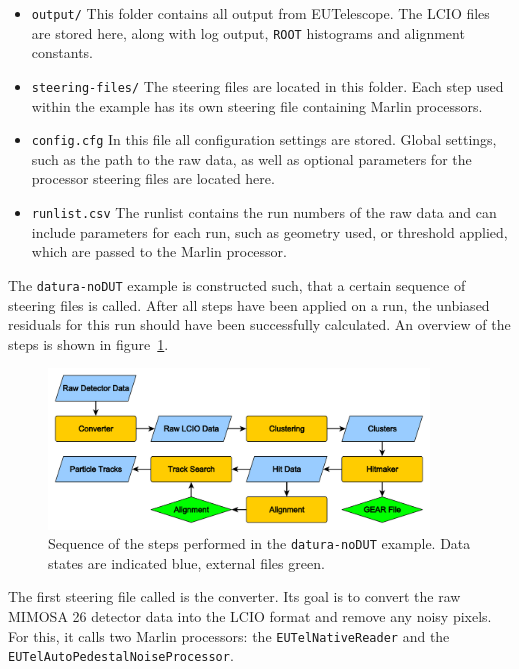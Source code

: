 \begin{itemize}

\item \texttt{output/} This folder contains all output from EUTelescope. The
LCIO files are stored here, along with log output, \texttt{ROOT} histograms and
alignment constants.

\item \texttt{steering-files/} The steering files are located in this folder.
Each step used within the example has its own steering file containing Marlin
processors.

\item\texttt{config.cfg} In this file all configuration settings are stored.
Global settings, such as the path to the raw data, as well as optional
parameters for the processor steering files are located here.

\item \texttt{runlist.csv} The runlist contains the run numbers of the raw
data and can include parameters for each run, such as geometry used, or
threshold applied, which are passed to the Marlin processor.

\end{itemize}

The \texttt{datura-noDUT} example is constructed such, that a certain sequence
of steering files is called. After all steps have been applied on a run, the
unbiased residuals for this run should have been successfully calculated. An
overview of the steps is shown in figure~\ref{fig:datura-nodutsequence}.

\begin{figure}[tbp]
  \centering
  \includegraphics[width=0.9\textwidth]{figures/datura-noDUT_paper}
  \caption[Steps performed in the \texttt{datura-noDUT} example]{Sequence of the
steps performed in the \texttt{datura-noDUT} example. Data states are indicated
blue, external files green.}
  \label{fig:datura-nodutsequence}
\end{figure}

The first steering file called is the converter. Its goal is to convert the raw
MIMOSA 26 detector data into the LCIO format and remove any noisy pixels. For
this, it calls two Marlin processors: the \texttt{EUTelNativeReader} and the
\texttt{EUTelAutoPede\-stalNoiseProcessor}.

